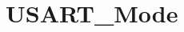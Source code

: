 \hypertarget{group___u_s_a_r_t___mode}{\section{U\-S\-A\-R\-T\-\_\-\-Mode}
\label{group___u_s_a_r_t___mode}
}

